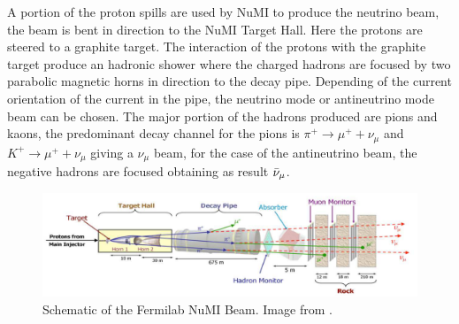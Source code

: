 A portion of the proton spills are used by NuMI to produce the neutrino beam, the beam is bent in direction to the NuMI Target Hall. Here the protons are steered to a graphite target. The interaction of the protons with the graphite target produce an hadronic shower where the charged hadrons are focused by two parabolic magnetic horns in direction to the decay pipe. Depending of the current orientation of the current in the pipe, the neutrino mode or antineutrino mode beam can be chosen. The major portion of the hadrons produced are pions and kaons, the predominant decay channel for the pions is $\pi^+ \longrightarrow \mu^+ + \nu_\mu$ and $K^+ \longrightarrow \mu^+ + \nu_\mu$ giving a $\nu_\mu$ beam, for the case of the antineutrino beam, the negative hadrons are focused obtaining as result $\Bar{\nu}_\mu$. 


\begin{figure}[!htb]
\centering
\includegraphics[scale=0.38]{Figures/Chapter2/NuMIScketch.png}
        \caption{Schematic of the Fermilab NuMI Beam. Image from \cite{Numi}.} 
\label{fig:MnvExp:NuMI:SchematicNuMIBeam}
\end{figure}

